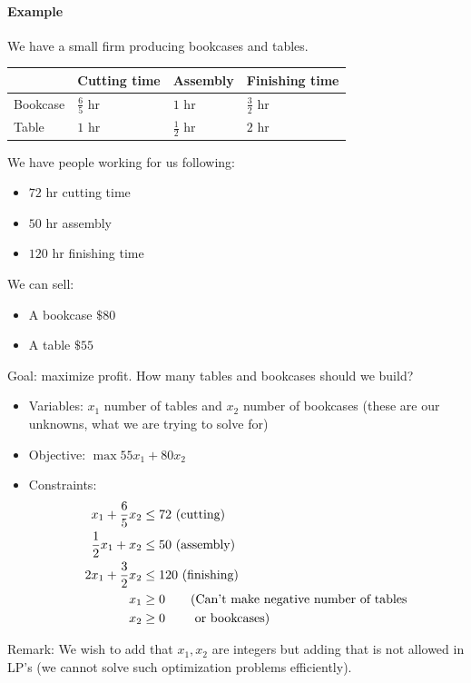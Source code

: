 \documentclass[12 pt]{article}
\begin{document}
        \paragraph{Example} We have a small firm producing bookcases
        and tables.
        \\
        \begin{tabular}{l | l | l | l}
          & Cutting time & Assembly & Finishing time
          \\ \hline Bookcase & $\frac{6}{5}$ hr & $1$ hr & $\frac{3}{2}$ hr
          \\ Table & $1$ hr & $\frac{1}{2}$ hr & $2$ hr
        \end{tabular}
        We have people working for us following:
        \begin{itemize}
        \item $72$ hr cutting time
        \item $50$ hr assembly
        \item $120$ hr finishing time
        \end{itemize}
        We can sell:
        \begin{itemize}
        \item A bookcase $\$80$
        \item A table $\$55$
        \end{itemize}
        Goal: maximize profit. How many tables and bookcases should we
        build?
        \begin{itemize}
        \item Variables: $x_1$ number of tables and $x_2$ number of
          bookcases (these are our unknowns, what we are trying to
          solve for)
        \item Objective: $\max 55x_1 + 80x_2$
        \item Constraints:
          \begin{align*}
            x_1 + \frac{6}{5}x_2 & \leq 72 \text{ (cutting)}
            \\ \frac{1}{2}x_1 + x_2 & \leq 50 \text{ (assembly)}
            \\ 2x_1 + \frac{3}{2}x_2 & \leq 120 \text{ (finishing)}
            \\ x_1 & \geq 0 \text{\hspace{20 pt}(Can't make negative number of tables}
            \\ x_2 & \geq 0 \text{\hspace{20 pt} or bookcases)}
          \end{align*}
        \end{itemize}
        Remark: We wish to add that $x_1, x_2$ are integers but adding
        that is not allowed in LP's (we cannot solve such optimization
        problems efficiently).
\end{document}
